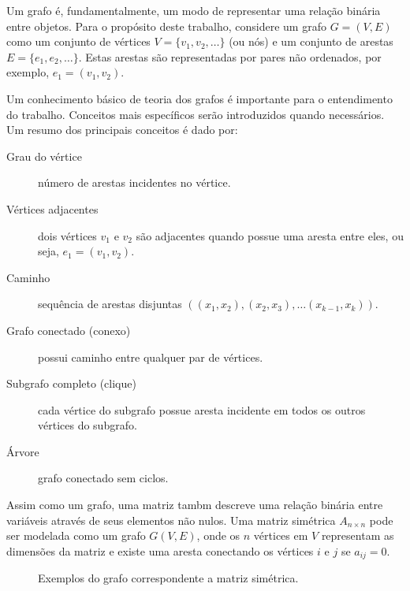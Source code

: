 Um grafo é, fundamentalmente, um modo de representar uma relação binária entre objetos. Para o propósito deste trabalho, considere um grafo $G = (V, E)$ como um conjunto de vértices $V = \{v_1, v_2, \ldots \}$ (ou nós) e um conjunto de arestas $E = \{e_1, e_2, \ldots \}$. Estas arestas são representadas por pares não ordenados, por exemplo, $e_1 = (v_1 , v_2)$.

Um conhecimento básico de teoria dos grafos é importante para o entendimento do trabalho. Conceitos mais específicos serão introduzidos quando necessários. Um resumo dos principais conceitos é dado por:
\begin{description}
    \item[Grau do vértice] número de arestas incidentes no vértice.
    \item[Vértices adjacentes]  dois vértices $v_1$ e $v_2$ são adjacentes quando possue uma aresta entre eles, ou seja, $e_1 = (v_1, v_2)$.
    \item[Caminho] sequência de arestas disjuntas $\left( (x_1, x_2), (x_2, x_3), \ldots (x_{k - 1}, x_k) \right)$.
    \item[Grafo conectado (conexo)] possui caminho entre qualquer par de vértices.
    \item[Subgrafo completo (clique)] cada vértice do subgrafo possue aresta incidente em todos os outros vértices do subgrafo.
    \item[Árvore] grafo conectado sem ciclos.
\end{description}

Assim como um grafo, uma matriz tambm descreve uma relação binária entre variáveis através de seus elementos não nulos. Uma matriz simétrica $A_{n \times n}$ pode ser modelada como um grafo $G(V, E)$, onde os $n$ vértices em $V$ representam as dimensões da matriz e existe uma aresta conectando os vértices $i$ e $j$ se $a_{ij} = 0$.

\begin{figure}[!htb]
    \centering
    \caption{Exemplos do grafo correspondente a matriz simétrica.}
    \label{fig:exem_graph}
\end{figure}
